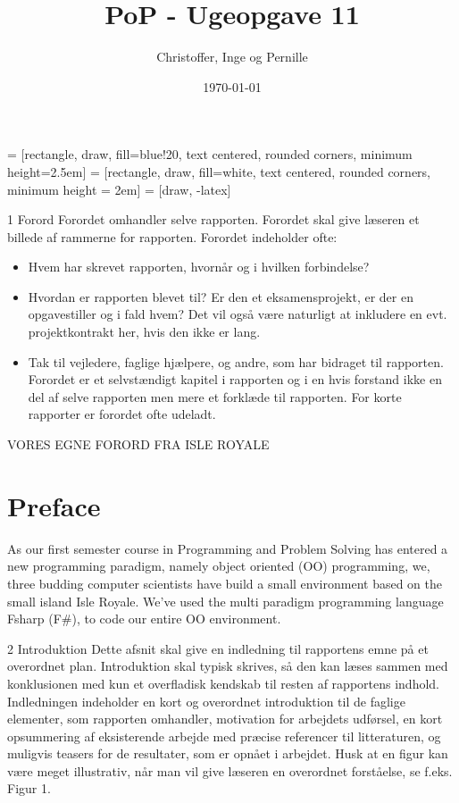 \documentclass[a4paper]{report}
\title{PoP - Ugeopgave 11}
\author{Christoffer, Inge og Pernille}
\date{\today}
\begin{document}
\maketitle
{} = [rectangle, draw, fill=blue!20, text centered,
    rounded corners, minimum height=2.5em]
 = [rectangle, draw, fill=white, text centered,
    rounded corners, minimum height = 2em]
 = [draw, -latex]



1 Forord
Forordet omhandler selve rapporten. Forordet skal give læseren et billede af rammerne for rapporten.
Forordet indeholder ofte:

\begin{itemize}
\item Hvem har skrevet rapporten, hvornår og i hvilken forbindelse?
\item Hvordan er rapporten blevet til? Er den et eksamensprojekt, er der en opgavestiller og i fald hvem?
Det vil også være naturligt at inkludere en evt. projektkontrakt her, hvis den ikke er lang.
\item Tak til vejledere, faglige hjælpere, og andre, som har bidraget til rapporten.
Forordet er et selvstændigt kapitel i rapporten og i en hvis forstand ikke en del af selve rapporten men
mere et forklæde til rapporten. For korte rapporter er forordet ofte udeladt.
\end{itemize}

VORES EGNE FORORD FRA ISLE ROYALE
\section*{Preface}
As our first semester course in Programming and Problem Solving has entered a new programming paradigm, namely object oriented (OO) programming, we, three budding computer scientists have build a small environment based on the small island Isle Royale. We've used the multi paradigm programming language Fsharp (F\#), to code our entire OO environment.

2 Introduktion
Dette afsnit skal give en indledning til rapportens emne på et overordnet plan. Introduktion skal typisk
skrives, så den kan læses sammen med konklusionen med kun et overfladisk kendskab til resten af rapportens indhold. Indledningen indeholder en kort og overordnet introduktion til de faglige elementer, som
rapporten omhandler, motivation for arbejdets udførsel, en kort opsummering af eksisterende arbejde med præcise referencer til litteraturen, og muligvis teasers for de resultater, som er opnået i arbejdet.
Husk at en figur kan være meget illustrativ, når man vil give læseren en overordnet forståelse, se f.eks.
Figur 1.
\end{document}
